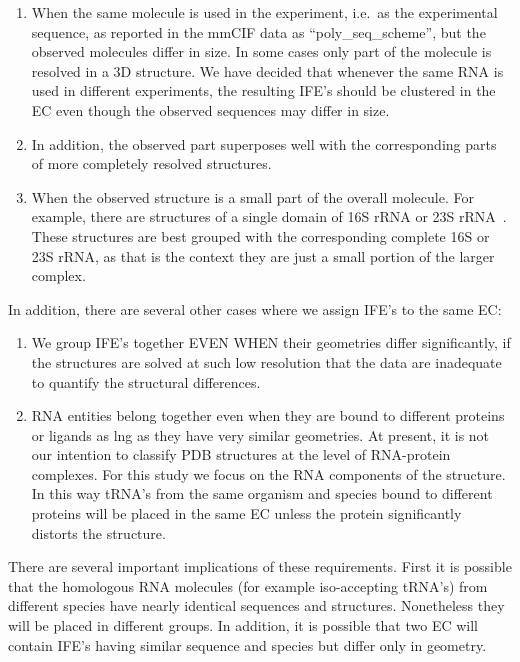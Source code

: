 \begin{enumerate}
  \item When the same molecule is used in the experiment, i.e.\ as the
    experimental sequence, as reported in the mmCIF data as
    ``poly\_seq\_scheme'', but the observed molecules differ in size. In some
    cases only part of the molecule is resolved in a 3D structure. We have
    decided that whenever the same RNA is used in different experiments, the
    resulting IFE's should be clustered in the EC even though the observed
    sequences may differ in size.

  \item In addition, the observed part superposes well with the corresponding parts of
    more completely resolved structures.

  \item When the observed structure is a small part of the overall molecule. For
    example, there are structures of a single domain of 16S rRNA or 23S
    rRNA~\cite{Nissen2000}. These structures are best grouped with the
    corresponding complete 16S or 23S rRNA, as that is the context they are just
    a small
    portion of the larger complex.
\end{enumerate}

In addition, there are several other cases where we assign IFE's to the same EC:

\begin{enumerate}
  \item We group IFE's together EVEN WHEN their geometries differ significantly,
    if the structures are solved at such low resolution that the data are inadequate to
    quantify the structural differences.

  \item RNA entities belong together even when they are bound to different proteins
    or ligands as lng as they have very similar geometries. At present,
    it is not our intention to classify PDB structures at the level of
    RNA-protein complexes. For this study we focus on the RNA components of the
    structure. In this way tRNA's from the same organism and species bound to
    different proteins will be placed in the same EC unless the protein
    significantly distorts the structure.
\end{enumerate}

There are several important implications of these requirements. First it is
possible that the homologous RNA molecules (for example iso-accepting tRNA's)
from different species have nearly identical sequences and structures.
Nonetheless they will be placed in different groups. In addition, it is possible
that two EC will contain IFE's having similar sequence and species but differ
only in geometry.

